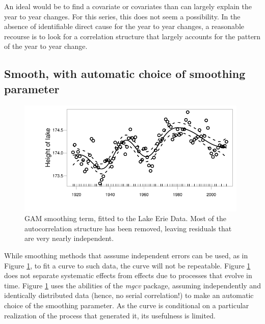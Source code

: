 \documentclass{tufte-book}\usepackage[]{graphicx}\usepackage[]{color}
\begin{document}
An ideal would be to find a covariate or covariates than can largely
explain the year to year changes.  For this series, this does not seem
a possibility.  In the absence of identifiable direct cause for the
year to year changes, a reasonable recourse is to look for a
correlation structure that largely accounts for the pattern of the
year to year change.  

\subsection*{Smooth, with automatic choice of smoothing parameter}

\begin{figure}
\begin{Schunk}


\centerline{\includegraphics[width=0.98\textwidth]{figs/9-gamErie-1} }

\end{Schunk}
\caption{GAM smoothing term, fitted to the Lake Erie Data.
    Most of the autocorrelation structure has been
    removed, leaving residuals that are very nearly independent.
  }\label{lh-smoothplot}
\end{figure}

\begin{marginfigure}[-3.5cm]
\begin{Schunk}
\end{Schunk}
\end{marginfigure}

While smoothing methods that asssume independent errors can be
used, as in Figure \ref{lh-smoothplot}, to fit a curve to such
data, the curve will not be repeatable.  Figure \ref{lh-smoothplot}
does not separate systematic effects from effects due to processes
that evolve in time. Figure \ref{lh-smoothplot} uses the
abilities of the {\em mgcv} package, assuming independently and
identically distributed data (hence, no serial correlation!) to
make an automatic choice of the smoothing parameter.  
As the curve is conditional on a particular realization of the process
that generated it, its usefulness is limited.
\end{document}
